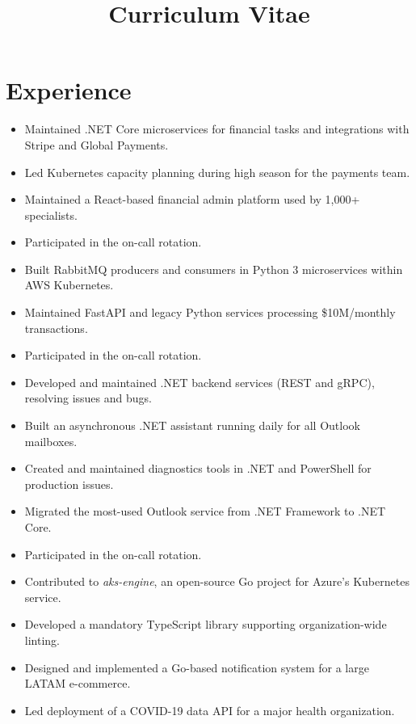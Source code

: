 \documentclass[10pt, a4paper, roman]{moderncv} %
\title{Curriculum Vitae}
\begin{document}
\makecvtitle %

\section{Experience}

{
    \begin{itemize}
        \item Maintained .NET Core microservices for financial tasks and integrations with Stripe and Global Payments.
        \item Led Kubernetes capacity planning during high season for the payments team.
        \item Maintained a React-based financial admin platform used by 1,000+ specialists.
        \item Participated in the on-call rotation.
    \end{itemize}
}

{
    \begin{itemize}
        \item Built RabbitMQ producers and consumers in Python 3 microservices within AWS Kubernetes.
        \item Maintained FastAPI and legacy Python services processing \$10M/monthly transactions.
        \item Participated in the on-call rotation.
    \end{itemize}
}

{
    \begin{itemize}
        \item Developed and maintained .NET backend services (REST and gRPC), resolving issues and bugs.
        \item Built an asynchronous .NET assistant running daily for all Outlook mailboxes.
        \item Created and maintained diagnostics tools in .NET and PowerShell for production issues.
        \item Migrated the most-used Outlook service from .NET Framework to .NET Core.
        \item Participated in the on-call rotation.
    \end{itemize}
}

{
    \begin{itemize}
	    \item Contributed to \textit{aks-engine}, an open-source Go project for Azure's Kubernetes service.
	    \item Developed a mandatory TypeScript library supporting organization-wide linting.
        \item Designed and implemented a Go-based notification system for a large LATAM e-commerce.
        \item Led deployment of a COVID-19 data API for a major health organization.
    \end{itemize}
}
\end{document}
